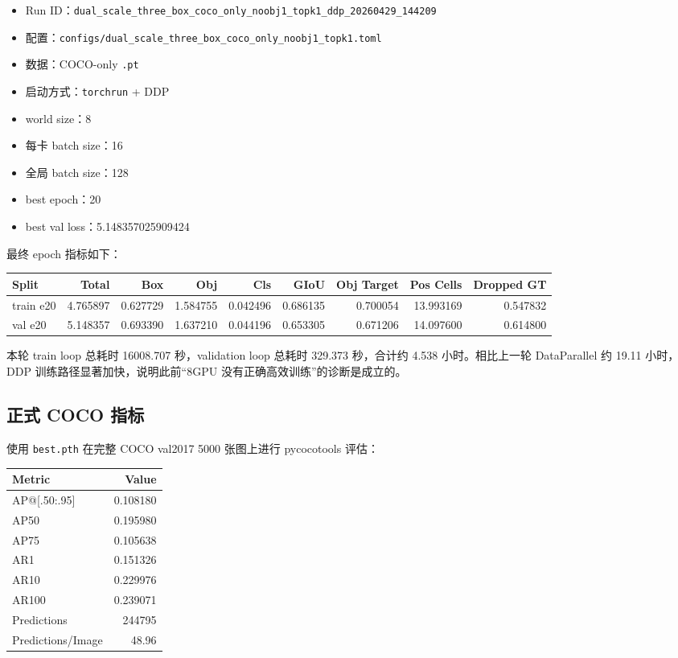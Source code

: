 \documentclass[UTF8]{ctexart}
\begin{document}
\begin{itemize}[leftmargin=2em]
  \item Run ID：\texttt{dual\_scale\_three\_box\_coco\_only\_noobj1\_topk1\_ddp\_20260429\_144209}
  \item 配置：\texttt{configs/dual\_scale\_three\_box\_coco\_only\_noobj1\_topk1.toml}
  \item 数据：COCO-only \texttt{.pt}
  \item 启动方式：\texttt{torchrun} + DDP
  \item world size：8
  \item 每卡 batch size：16
  \item 全局 batch size：128
  \item best epoch：20
  \item best val loss：5.148357025909424
\end{itemize}

最终 epoch 指标如下：

\begin{center}
\begin{tabular}{lrrrrrrrr}
\toprule
Split & Total & Box & Obj & Cls & GIoU & Obj Target & Pos Cells & Dropped GT \\
\midrule
train e20 & 4.765897 & 0.627729 & 1.584755 & 0.042496 & 0.686135 & 0.700054 & 13.993169 & 0.547832 \\
val e20 & 5.148357 & 0.693390 & 1.637210 & 0.044196 & 0.653305 & 0.671206 & 14.097600 & 0.614800 \\
\bottomrule
\end{tabular}
\end{center}

本轮 train loop 总耗时 16008.707 秒，validation loop 总耗时 329.373 秒，合计约 4.538 小时。相比上一轮 DataParallel 约 19.11 小时，DDP 训练路径显著加快，说明此前“8GPU 没有正确高效训练”的诊断是成立的。

\subsection{正式 COCO 指标}

使用 \texttt{best.pth} 在完整 COCO val2017 5000 张图上进行 pycocotools 评估：

\begin{center}
\begin{tabular}{lr}
\toprule
Metric & Value \\
\midrule
AP@[.50:.95] & 0.108180 \\
AP50 & 0.195980 \\
AP75 & 0.105638 \\
AR1 & 0.151326 \\
AR10 & 0.229976 \\
AR100 & 0.239071 \\
Predictions & 244795 \\
Predictions/Image & 48.96 \\
\bottomrule
\end{tabular}
\end{center}
\end{document}
